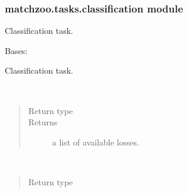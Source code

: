 \documentclass[letterpaper,10pt,english]{sphinxmanual}
\begin{document}
\subsubsection{matchzoo.tasks.classification module}
\label{\detokenize{matchzoo.tasks:module-matchzoo.tasks.classification}}\label{\detokenize{matchzoo.tasks:matchzoo-tasks-classification-module}}
Classification task.

\begin{fulllineitems}
\label{\detokenize{matchzoo.tasks:matchzoo.tasks.classification.Classification}}
Bases: {\hyperref[\detokenize{matchzoo.engine:matchzoo.engine.base_task.BaseTask}]{}}

Classification task.

\begin{fulllineitems}
\label{\detokenize{matchzoo.tasks:matchzoo.tasks.classification.Classification.list_available_losses}}~\begin{quote}\begin{description}
\item[{Return type}] \leavevmode
{}

\item[{Returns}] \leavevmode
a list of available losses.

\end{description}\end{quote}

\end{fulllineitems}


\begin{fulllineitems}
\label{\detokenize{matchzoo.tasks:matchzoo.tasks.classification.Classification.list_available_metrics}}~\begin{quote}\begin{description}
\item[{Return type}] \leavevmode
{}


\end{description}
\end{quote}
\end{fulllineitems}
\end{fulllineitems}
\end{document}
